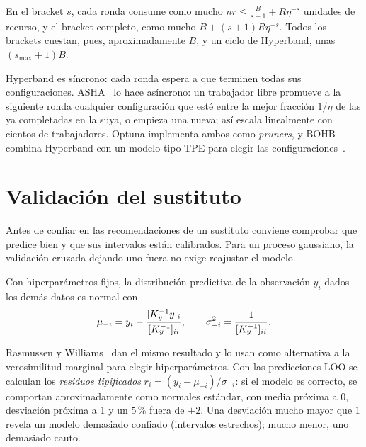 \begin{proposicion}\label{prop:bracket}
En el bracket $s$, cada ronda consume como mucho $nr\le\frac{B}{s+1}+R\eta^{-s}$ unidades de recurso, y el bracket completo, como mucho $B+(s+1)R\eta^{-s}$. Todos los brackets cuestan, pues, aproximadamente $B$, y un ciclo de Hyperband, unas $(s_{\max}+1)B$.
\end{proposicion}

\addtocounter{definicion}{1}%

Hyperband es síncrono: cada ronda espera a que terminen todas sus configuraciones. ASHA~\cite{asha} lo hace asíncrono: un trabajador libre promueve a la siguiente ronda cualquier configuración que esté entre la mejor fracción $1/\eta$ de las ya completadas en la suya, o empieza una nueva; así escala linealmente con cientos de trabajadores. Optuna implementa ambos como \emph{pruners}, y BOHB combina Hyperband con un modelo tipo TPE para elegir las configuraciones~\cite[§1.4.2]{feurer}.

\section{Validación del sustituto}

Antes de confiar en las recomendaciones de un sustituto conviene comprobar que predice bien y que sus intervalos están calibrados. Para un proceso gaussiano, la validación cruzada dejando uno fuera no exige reajustar el modelo.

\begin{teorema}\label{teo:loo}
Con hiperparámetros fijos, la distribución predictiva de la observación $y_i$ dados los demás datos es normal con
\[
\mu_{-i}=y_i-\frac{[K_{y}^{-1}y]_i}{[K_{y}^{-1}]_{ii}},\qquad \sigma_{-i}^2=\frac{1}{[K_{y}^{-1}]_{ii}} .
\]
\end{teorema}

Rasmussen y Williams~\cite[cap.~5]{rw} dan el mismo resultado y lo usan como alternativa a la verosimilitud marginal para elegir hiperparámetros. Con las predicciones LOO se calculan los \emph{residuos tipificados} $r_i=(y_i-\mu_{-i})/\sigma_{-i}$: si el modelo es correcto, se comportan aproximadamente como normales estándar, con media próxima a 0, desviación próxima a 1 y un $5\,\%$ fuera de $\pm2$. Una desviación mucho mayor que 1 revela un modelo demasiado confiado (intervalos estrechos); mucho menor, uno demasiado cauto.

\addtocounter{definicion}{1}%

